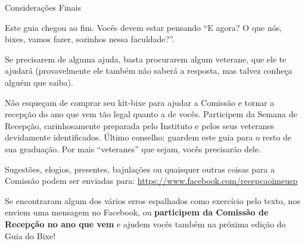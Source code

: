 \begin{secao}{Considerações Finais}

Este guia chegou ao fim. Vocês devem estar pensando ``E agora? O que nós, bixes,
vamos fazer, sozinhos nessa faculdade?''.

Se precisarem de alguma ajuda, basta procurarem algum veterane, que ele te
ajudará (provavelmente ele também não saberá a resposta, mas talvez conheça
alguém que saiba).

Não esqueçam de comprar seu kit-bixe para ajudar a Comissão e tornar a recepção
do ano que vem tão legal quanto a de vocês. Participem da Semana de Recepção,
carinhosamente preparada pelo Instituto e pelos seus veteranes devidamente
identificados. Último conselho: guardem este guia para o resto de sua graduação.
Por mais ``veteranes'' que sejam, vocês precisarão dele.

Sugestões, elogios, presentes, bajulações ou quaisquer outras coisas para a
Comissão podem ser enviadas para: \url{https://www.facebook.com/recepcaoimeusp}

Se encontraram algum dos vários erros espalhados como exercício pelo texto,
nos enviem uma mensagem no Facebook, ou \textbf{participem da Comissão de Recepção 
no ano que vem} e ajudem vocês também na próxima edição do Guia do Bixe!

\end{secao}

